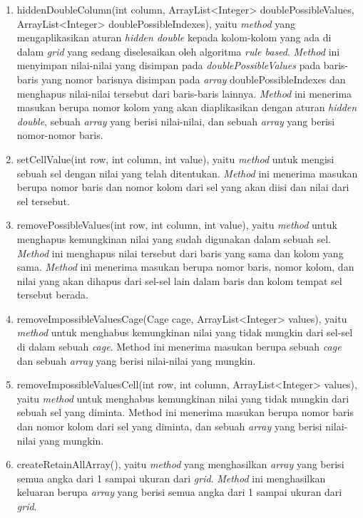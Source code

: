 \begin{enumerate}
\item hiddenDoubleColumn(int column, ArrayList<Integer> doublePossibleValues, ArrayList<Integer> doublePossibleIndexes), yaitu \textit{method} yang mengaplikasikan aturan \textit{hidden double} kepada kolom-kolom yang ada di dalam \textit{grid} yang sedang diselesaikan oleh algoritma \textit{rule based}. \textit{Method} ini menyimpan nilai-nilai yang disimpan pada \textit{doublePossibleValues} pada baris-baris yang nomor barisnya disimpan pada \textit{array} doublePossibleIndexes dan menghapus nilai-nilai tersebut dari baris-baris lainnya. \textit{Method} ini menerima masukan berupa nomor kolom yang akan diaplikasikan dengan aturan \textit{hidden double}, sebuah \textit{array} yang berisi nilai-nilai, dan sebuah \textit{array} yang berisi nomor-nomor baris.
\item setCellValue(int row, int column, int value), yaitu \textit{method} untuk mengisi sebuah sel dengan nilai yang telah ditentukan. \textit{Method} ini menerima masukan berupa nomor baris dan nomor kolom dari sel yang akan diisi dan nilai dari sel tersebut.
\item removePossibleValues(int row, int column, int value), yaitu \textit{method} untuk menghapus kemungkinan nilai yang sudah digunakan dalam sebuah sel. \textit{Method} ini menghapus nilai tersebut dari baris yang sama dan kolom yang sama. \textit{Method} ini menerima masukan berupa nomor baris, nomor kolom, dan nilai yang akan dihapus dari sel-sel lain dalam baris dan kolom tempat sel tersebut berada.
\item removeImpossibleValuesCage(Cage cage, ArrayList<Integer> values), yaitu \textit{method} untuk menghabus kemungkinan nilai yang tidak mungkin dari sel-sel di dalam sebuah \textit{cage}. Method ini menerima masukan berupa sebuah \textit{cage} dan sebuah \textit{array} yang berisi nilai-nilai yang mungkin.
\item removeImpossibleValuesCell(int row, int column, ArrayList<Integer> values), yaitu \textit{method} untuk menghabus kemungkinan nilai yang tidak mungkin dari sebuah sel yang diminta. Method ini menerima masukan berupa nomor baris dan nomor kolom dari sel yang diminta, dan sebuah \textit{array} yang berisi nilai-nilai yang mungkin.
\item createRetainAllArray(), yaitu \textit{method} yang menghasilkan \textit{array} yang berisi semua angka dari 1 sampai ukuran dari \textit{grid}. \textit{Method} ini menghasilkan keluaran berupa \textit{array} yang berisi semua angka dari 1 sampai ukuran dari \textit{grid}.

\end{enumerate}
